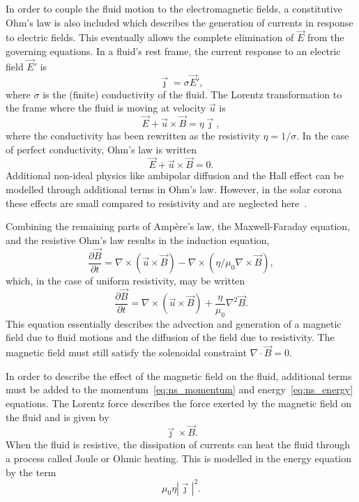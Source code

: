 In order to couple the fluid motion to the electromagnetic fields, a constitutive Ohm's law is also included which describes the generation of currents in response to electric fields. This eventually allows the complete elimination of $\vec{E}$ from the governing equations. In a fluid's rest frame, the current response to an electric field $\vec{E}'$ is
\begin{equation}
  \label{eq:rest_frame_ohms_law}
  \vec{\jmath} = \sigma \vec{E}',
\end{equation}
where $\sigma$ is the (finite) conductivity of the fluid. The Lorentz transformation to the frame where the fluid is moving at velocity $\vec{u}$ is
\begin{equation}
  \label{eq:resistive_ohms_law}
  {\vec {E}}+{\vec{u}}\times {\vec {B}}=\eta{\vec {\jmath}},
\end{equation}
where the conductivity has been rewritten as the resistivity $\eta = 1/\sigma$. In the case of perfect conductivity, Ohm's law is written
\begin{equation}
  \label{eq:ideal_ohms_law}
  {\vec {E}}+{\vec{u}}\times {\vec {B}}=0.
\end{equation}
Additional non-ideal physics like ambipolar diffusion and the Hall effect can be modelled through additional terms in Ohm's law. However, in the solar corona these effects are small compared to resistivity and are neglected here~\cite{priestMagnetohydrodynamicsSuna}.

Combining the remaining parts of Ampère's law, the Maxwell-Faraday equation, and the resistive Ohm's law results in the induction equation,
\begin{equation}
  \label{eq:nonsimple_induction_equation}
{\frac {\partial \vec {B} }{\partial t}} = \nabla \times (\vec{u} \times \vec{B}) - \nabla \times (\eta/\mu_0 \nabla \times \vec{B}),
\end{equation}
which, in the case of uniform resistivity, may be written
\begin{equation}
  \label{eq:induction_equation}
{\frac {\partial \vec {B} }{\partial t}} = \nabla \times (\vec{u} \times \vec{B}) + \frac{\eta}{\mu_0}\nabla^2 \vec{B}.
\end{equation}
This equation essentially describes the advection and generation of a magnetic field due to fluid motions and the diffusion of the field due to resistivity. The magnetic field must still satisfy the solenoidal constraint $\nabla \cdot \vec{B} = 0$.

In order to describe the effect of the magnetic field on the fluid, additional terms must be added to the momentum~\eqref{eq:ns_momentum} and energy~\eqref{eq:ns_energy} equations. The Lorentz force describes the force exerted by the magnetic field on the fluid and is given by
\begin{equation}
  \label{eq:lorentz_force}
\vec{\jmath} \times \vec{B}.
\end{equation}
When the fluid is resistive, the dissipation of currents can heat the fluid through a process called Joule or Ohmic heating. This is modelled in the energy equation by the term
\begin{equation}
\mu_0 \eta | \vec{\jmath} |^2.
\end{equation}

